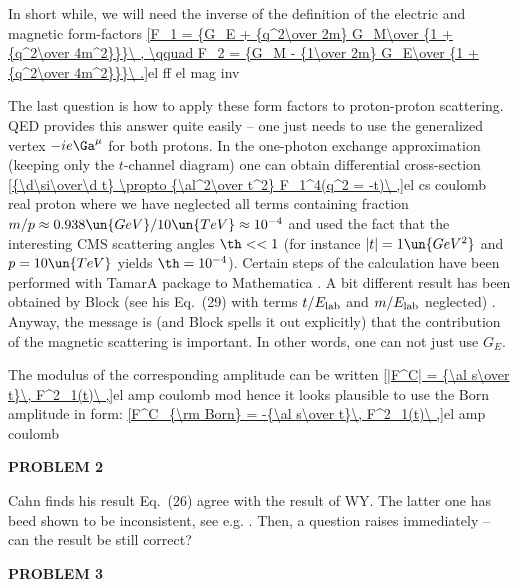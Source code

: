 In short while, we will need the inverse of the definition of the electric and magnetic form-factors
\eqref{F_1 = {G_E + {q^2\over 2m} G_M\over {1 + {q^2\over 4m^2}}}\ , \qquad F_2 = {G_M - {1\over 2m} G_E\over {1 + {q^2\over 4m^2}}}\ .}{el ff el mag inv}

The last question is how to apply these form factors to proton-proton scattering. QED provides this answer quite easily -- one just needs to use the generalized vertex $-ie\Ga^\mu$ for both protons. In the one-photon exchange approximation (keeping only the $t$-channel diagram) one can obtain differential cross-section
\eqref{{\d\si\over\d t} \propto {\al^2\over t^2} F_1^4(q^2 = -t)\ ,}{el cs coulomb real proton}
where we have neglected all terms containing fraction $m/p\approx 0.938\un{GeV}/10\un{TeV}\approx 10^{-4}$ and used the fact that the interesting CMS scattering angles $\th<<1$ (for instance $|t|=1\un{GeV^2}$ and $p=10\un{TeV}$ yields $\th=10^{-4}$). Certain steps of the calculation have been performed with TamarA package  to Mathematica . A bit different result has been obtained by Block  (see his Eq.~(29) with terms $t/E_{\rm lab}$ and $m/E_{\rm lab}$ neglected) . Anyway, the message is (and Block spells it out explicitly) that the contribution of the magnetic scattering is important. In other words, one can not just use $G_E$.


The modulus of the corresponding amplitude can be written
\eqref{|F^C| = {\al s\over t}\, F^2_1(t)\ ,}{el amp coulomb mod}
hence it looks plausible to use the Born amplitude in form:
\eqref{F^C_{\rm Born} = -{\al s\over t}\, F^2_1(t)\ ,}{el amp coulomb}

{\bf PROBLEM 2}

Cahn finds his result Eq.~(26) agree with the result of WY. The latter one has beed shown to be inconsistent, see e.g. . Then, a question raises immediately -- can the result be still correct?

{\bf PROBLEM 3}

